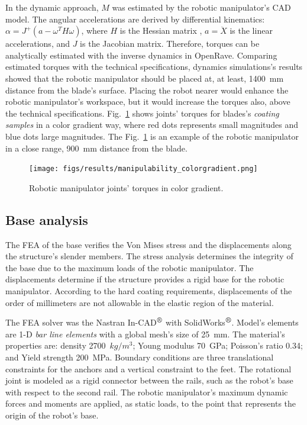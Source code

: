 In the dynamic approach, $M$ was estimated by the robotic manipulator's CAD
model. The angular accelerations are derived by differential kinematics:
$\alpha=J^+(a-\omega^TH\omega)$, where $H$ is the Hessian matrix
\cite{hourtash2005kinematic}, $a=\ddot{X}$ is the linear accelerations, and $J$
is the Jacobian matrix. Therefore, torques can be analytically estimated with
the inverse dynamics in OpenRave. Comparing estimated torques with the technical
specifications, dynamics simulations's results showed that the robotic
manipulator should be placed at, at least, 1400~mm distance from the blade's
surface. Placing the robot nearer would enhance the robotic manipulator's
workspace, but it would increase the torques also, above the technical
specifications. Fig.~\ref{fig:torques} shows joints' torques for blades's
\textit{coating samples} in a color gradient way, where red dots represents
small magnitudes and blue dots large magnitudes. The Fig.~\ref{fig:torques} is
an example of the robotic manipulator in a close range, 900~mm distance from the
blade.

\begin{figure}
	\centering
	\texttt{[image: figs/results/manipulability\_colorgradient.png]}
    \caption{Robotic manipulator joints' torques in color gradient.}
    \label{fig:torques}
\end{figure}

\subsection{Base analysis}

The FEA of the base verifies the Von Mises stress and the displacements
along the structure's slender members. The stress analysis determines the
integrity of the base due to the maximum loads of the robotic manipulator. The
displacements determine if the structure provides a rigid base for the robotic
manipulator. According to the hard coating requirements, displacements of the
order of millimeters are not allowable in the elastic region of the
material. 

The FEA solver was the Nastran In-CAD$^{\mbox{\small\textregistered}}$ with
SolidWorks$^{\mbox{\small\textregistered}}$. Model's elements are 1-D 
\textit{bar line elements} with a global mesh's size of 25~mm. The material's
properties are: density 2700~$kg/m^3$; Young modulus 70~GPa; Poisson's ratio
0.34; and Yield strength 200~MPa. Boundary conditions are three translational
constraints for the anchors and a vertical constraint to the feet. The
rotational joint is modeled as a rigid connector between the rails, such as the
robot's base with respect to the second rail. The robotic manipulator's maximum
dynamic forces and moments are applied, as static loads, to the point that
represents the origin of the robot's base.

